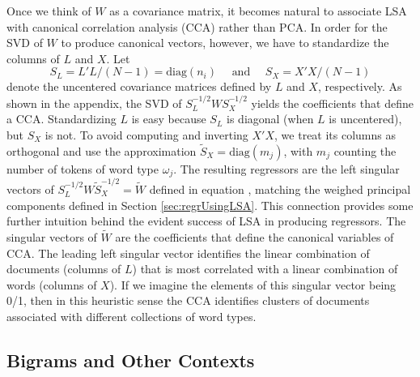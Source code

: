 \documentclass[12pt]{article}
\begin{document}
Once we think of $W$ as a covariance matrix, it becomes natural to associate LSA with canonical correlation analysis (CCA) rather than PCA.  In order for the SVD of $W$ to produce canonical vectors, however, we have to standardize the columns of $L$ and $X$.  Let 
\begin{equation}
  S_L = L'L/(N-1) = \mbox{diag}(n_i) \quad \mbox{ and  } \quad S_X = X'X/(N-1)
\label{eq:SL}
\end{equation}
denote the uncentered covariance matrices defined by $L$ and $X$, respectively.   As shown in the appendix, the SVD of $S_L^{-1/2} W S_X^{-1/2}$  yields the coefficients that define a CCA.  Standardizing $L$ is easy because $S_L$ is diagonal (when $L$ is uncentered), but $S_X$ is not.  To avoid computing and inverting $X'X$, we treat its columns as orthogonal and use the approximation $\widetilde{S}_X = \mbox{diag}(m_j)$, with $m_j$ counting the number of tokens of word type $\omega_j$. The resulting regressors are the left singular vectors of  $S_L^{-1/2} W \widetilde{S}_X^{-1/2} = \widetilde{W}$ defined in equation , matching the weighed principal components defined in Section \ref{sec:regrUsingLSA}.    This connection provides some further intuition behind the evident success of LSA in producing regressors.  The singular vectors of $\widetilde{W}$ are the coefficients that define the canonical variables of CCA.  The leading left singular vector identifies the linear combination of documents (columns of $L$) that is most correlated with a linear combination of words (columns of $X$).  If we imagine the elements of this singular vector being 0/1, then in this heuristic sense the CCA identifies clusters of documents associated with different collections of word types. 


\subsection{ Bigrams and Other Contexts } %
\label{sec:bigram}
\end{document}
